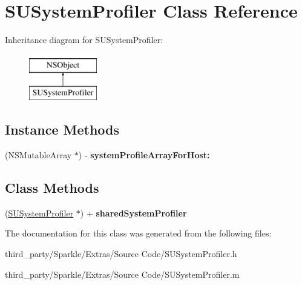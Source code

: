 \hypertarget{interface_s_u_system_profiler}{}\section{S\+U\+System\+Profiler Class Reference}
\label{interface_s_u_system_profiler}
Inheritance diagram for S\+U\+System\+Profiler\+:\begin{figure}[H]
\begin{center}
\leavevmode
\includegraphics[height=2.000000cm]{interface_s_u_system_profiler}
\end{center}
\end{figure}
\subsection*{Instance Methods}
\begin{DoxyCompactItemize}
\item 
\mbox{\label{interface_s_u_system_profiler_acaaed5d0a5ce5dc6e78539e32966f8e5}} 
(N\+S\+Mutable\+Array $\ast$) -\/ {\bfseries system\+Profile\+Array\+For\+Host\+:}
\end{DoxyCompactItemize}
\subsection*{Class Methods}
\begin{DoxyCompactItemize}
\item 
\mbox{\label{interface_s_u_system_profiler_ae30ec9da318b4cecb6cb4654faba569a}} 
(\mbox{\hyperlink{interface_s_u_system_profiler}{S\+U\+System\+Profiler}} $\ast$) + {\bfseries shared\+System\+Profiler}
\end{DoxyCompactItemize}


The documentation for this class was generated from the following files\+:\begin{DoxyCompactItemize}
\item 
third\+\_\+party/\+Sparkle/\+Extras/\+Source Code/S\+U\+System\+Profiler.\+h\item 
third\+\_\+party/\+Sparkle/\+Extras/\+Source Code/S\+U\+System\+Profiler.\+m\end{DoxyCompactItemize}
